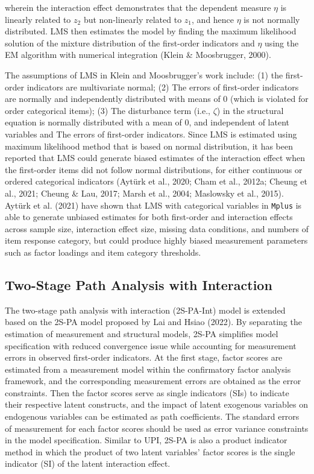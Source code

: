 \documentclass[
  man]{apa6}
\begin{document}
wherein the interaction effect demonstrates that the dependent measure \(\eta\) is linearly related to \(z_{2}\) but non-linearly related to \(z_{1}\), and hence \(\eta\) is not normally distributed. LMS then estimates the model by finding the maximum likelihood solution of the mixture distribution of the first-order indicators and \(\eta\) using the EM algorithm with numerical integration (Klein \& Moosbrugger, 2000).

The assumptions of LMS in Klein and Moosbrugger's work include: (1) the first-order indicators are multivariate normal; (2) The errors of first-order indicators are normally and independently distributed with means of 0 (which is violated for order categorical items); (3) The disturbance term (i.e., \(\zeta\)) in the structural equation is normally distributed with a mean of 0, and independent of latent variables and The errors of first-order indicators. Since LMS is estimated using maximum likelihood method that is based on normal distribution, it has been reported that LMS could generate biased estimates of the interaction effect when the first-order items did not follow normal distributions, for either continuous or ordered categorical indicators (Aytürk et al., 2020; Cham et al., 2012a; Cheung et al., 2021; Cheung \& Lau, 2017; Marsh et al., 2004; Maslowsky et al., 2015). Aytürk et al. (2021) have shown that LMS with categorical variables in \texttt{Mplus} is able to generate unbiased estimates for both first-order and interaction effects across sample size, interaction effect size, missing data conditions, and numbers of item response category, but could produce highly biased measurement parameters such as factor loadings and item category thresholds.

\hypertarget{two-stage-path-analysis-with-interaction}{%
\subsection{Two-Stage Path Analysis with Interaction}\label{two-stage-path-analysis-with-interaction}}

The two-stage path analysis with interaction (2S-PA-Int) model is extended based on the 2S-PA model proposed by Lai and Hsiao (2022). By separating the estimation of measurement and structural models, 2S-PA simplifies model specification with reduced convergence issue while accounting for measurement errors in observed first-order indicators. At the first stage, factor scores are estimated from a measurement model within the confirmatory factor analysis framework, and the corresponding measurement errors are obtained as the error constraints. Then the factor scores serve as single indicators (SIs) to indicate their respective latent constructs, and the impact of latent exogenous variables on endogenous variables can be estimated as path coefficients. The standard errors of measurement for each factor scores should be used as error variance constraints in the model specification. Similar to UPI, 2S-PA is also a product indicator method in which the product of two latent variables' factor scores is the single indicator (SI) of the latent interaction effect.
\end{document}
